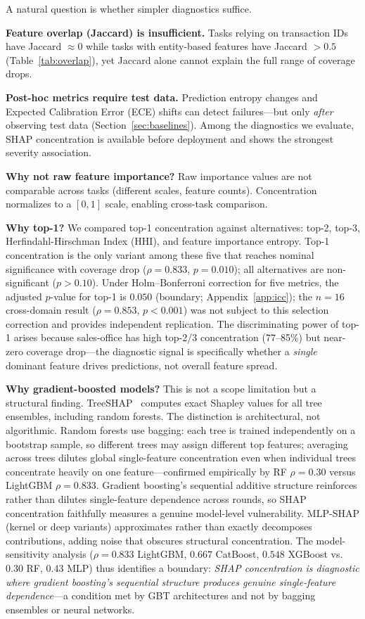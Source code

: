 \documentclass{uai2026} %
\begin{document}
A natural question is whether simpler diagnostics suffice.

\textbf{Feature overlap (Jaccard) is insufficient.} Tasks relying on transaction IDs have Jaccard $\approx 0$ while tasks with entity-based features have Jaccard $> 0.5$ (Table~\ref{tab:overlap}), yet Jaccard alone cannot explain the full range of coverage drops.

\textbf{Post-hoc metrics require test data.} Prediction entropy changes and Expected Calibration Error (ECE) shifts can detect failures---but only \textit{after} observing test data (Section~\ref{sec:baselines}). Among the diagnostics we evaluate, SHAP concentration is available before deployment and shows the strongest severity association.

\textbf{Why not raw feature importance?} Raw importance values are not comparable across tasks (different scales, feature counts). Concentration normalizes to a $[0,1]$ scale, enabling cross-task comparison.

\textbf{Why top-1?} We compared top-1 concentration against alternatives: top-2, top-3, Herfindahl-Hirschman Index (HHI), and feature importance entropy. Top-1 concentration is the only variant among these five that reaches nominal significance with coverage drop ($\rho = 0.833$, $p = 0.010$); all alternatives are non-significant ($p > 0.10$). Under Holm--Bonferroni correction for five metrics, the adjusted $p$-value for top-1 is $0.050$ (boundary; Appendix~\ref{app:icc}); the $n=16$ cross-domain result ($\rho = 0.853$, $p < 0.001$) was not subject to this selection correction and provides independent replication. The discriminating power of top-1 arises because sales-office has high top-2/3 concentration (77--85\%) but near-zero coverage drop---the diagnostic signal is specifically whether a \textit{single} dominant feature drives predictions, not overall feature spread.

\textbf{Why gradient-boosted models?} This is not a scope limitation but a structural finding. TreeSHAP~\citep{lundberg2018consistent,lundberg2020local} computes exact Shapley values for all tree ensembles, including random forests. The distinction is architectural, not algorithmic. Random forests use bagging: each tree is trained independently on a bootstrap sample, so different trees may assign different top features; averaging across trees dilutes global single-feature concentration even when individual trees concentrate heavily on one feature---confirmed empirically by RF $\rho=0.30$ versus LightGBM $\rho=0.833$. Gradient boosting's sequential additive structure reinforces rather than dilutes single-feature dependence across rounds, so SHAP concentration faithfully measures a genuine model-level vulnerability. MLP-SHAP (kernel or deep variants) approximates rather than exactly decomposes contributions, adding noise that obscures structural concentration. The model-sensitivity analysis ($\rho=0.833$ LightGBM, $0.667$ CatBoost, $0.548$ XGBoost vs.\ $0.30$ RF, $0.43$ MLP) thus identifies a boundary: \emph{SHAP concentration is diagnostic where gradient boosting's sequential structure produces genuine single-feature dependence}---a condition met by GBT architectures and not by bagging ensembles or neural networks.
\end{document}
